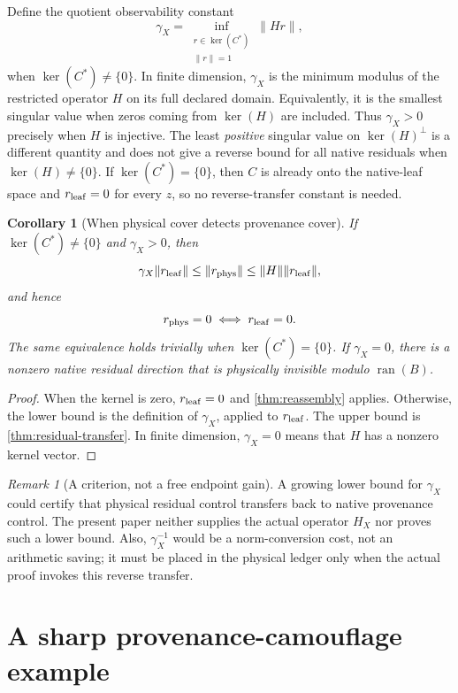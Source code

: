 \documentclass[11pt]{article}
\newtheorem{corollary}[theorem]{Corollary}
\theoremstyle{definition}
\theoremstyle{remark}
\newtheorem{remark}[theorem]{Remark}
\newcommand{\Ran}{\operatorname{ran}}
\newcommand{\Ker}{\operatorname{ker}}
\begin{document}
Define the quotient observability constant
\[
 \gamma_X
 =
 \inf_{\substack{r\in\Ker(C^*)\\\|r\|=1}}\|Hr\|,
\]
when \(\Ker(C^*)\ne\{0\}\).  In finite dimension, \(\gamma_X\) is the
minimum modulus of the restricted operator \(H\) on its full declared
domain.  Equivalently, it is the smallest singular value when zeros
coming from \(\Ker(H)\) are included.  Thus \(\gamma_X>0\) precisely
when \(H\) is injective.  The least \emph{positive} singular value on
\(\Ker(H)^\perp\) is a different quantity and does not give a reverse
bound for all native residuals when \(\Ker(H)\ne\{0\}\).  If
\(\Ker(C^*)=\{0\}\), then \(C\) is already onto the native-leaf space
and \(r_{\rm leaf}=0\) for every \(z\), so no reverse-transfer
constant is needed.

\begin{corollary}[When physical cover detects provenance cover]
\label{cor:observable}
If \(\Ker(C^*)\ne\{0\}\) and \(\gamma_X>0\), then
\[
 \gamma_X\|r_{\rm leaf}\|
 \le
 \|r_{\rm phys}\|
 \le
 \|H\|\|r_{\rm leaf}\|,
\]
and hence
\[
 r_{\rm phys}=0\iff r_{\rm leaf}=0.
\]
The same equivalence holds trivially when \(\Ker(C^*)=\{0\}\).
If \(\gamma_X=0\), there is a nonzero native residual direction that
is physically invisible modulo \(\Ran(B)\).
\end{corollary}

\begin{proof}
When the kernel is zero, \(r_{\rm leaf}=0\) and
\cref{thm:reassembly} applies.  Otherwise, the lower bound is the
definition of \(\gamma_X\), applied to
\(r_{\rm leaf}\).  The upper bound is
\cref{thm:residual-transfer}.  In finite dimension,
\(\gamma_X=0\) means that \(H\) has a nonzero kernel vector.
\end{proof}

\begin{remark}[A criterion, not a free endpoint gain]
A growing lower bound for \(\gamma_X\) could certify that physical
residual control transfers back to native provenance control.  The
present paper neither supplies the actual operator \(H_X\) nor proves
such a lower bound.  Also, \(\gamma_X^{-1}\) would be a norm-conversion
cost, not an arithmetic saving; it must be placed in the physical
ledger only when the actual proof invokes this reverse transfer.
\end{remark}

\section{A sharp provenance-camouflage example}
\end{document}
